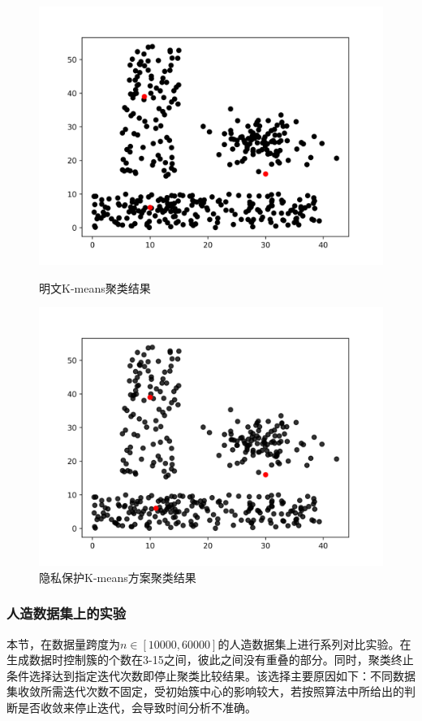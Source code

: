 \begin{figure}[htbp] %
	\begin{minipage}[t]{0.5\linewidth}
		\includegraphics[width=\linewidth]{img/lsun_ptxt.png}
		\caption{明文K-means聚类结果}
		\label{f4}
	\end{minipage}%
	\hfill%
	\begin{minipage}[t]{0.5\linewidth}
		\includegraphics[width=\linewidth]{img/lsun_ctxt.png}
		\caption{隐私保护K-means方案聚类结果}
		\label{f5}
	\end{minipage}
\end{figure}
\subsubsection{人造数据集上的实验}
本节，在数据量跨度为$ n\in[10000,60000] $的人造数据集上进行系列对比实验。在生成数据时控制簇的个数在3-15之间，彼此之间没有重叠的部分。同时，聚类终止条件选择达到指定迭代次数即停止聚类比较结果。该选择主要原因如下：不同数据集收敛所需迭代次数不固定，受初始簇中心的影响较大，若按照算法中所给出的判断是否收敛来停止迭代，会导致时间分析不准确。

